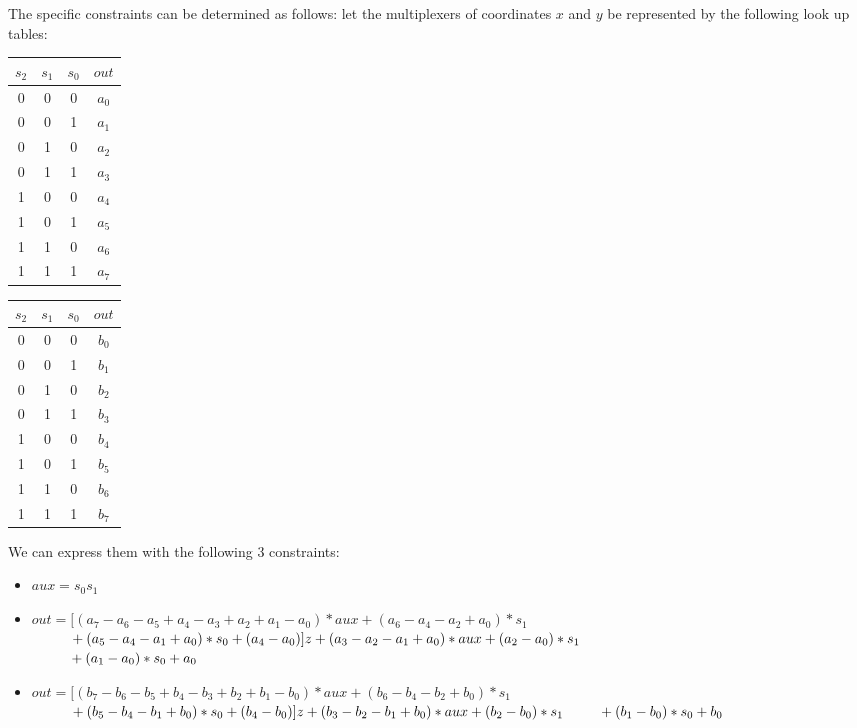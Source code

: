 The specific constraints can be determined as follows: let the multiplexers of coordinates $x$ and $y$ be represented by the following look up tables:
\newpage
\begin{table}[h]
    \begin{minipage}{.5\linewidth}
      \centering
	\begin{tabular}{c|c|c|c}
                $s_2$ & $s_1$ & $s_0$ & $out$\\
                	\hline
                	0 & 0 & 0 & $a_0$\\
                	0 & 0 & 1 & $a_1$\\
                	0 & 1 & 0 & $a_2$\\
                	0 & 1 & 1 & $a_3$\\
                	1 & 0 & 0 & $a_4$\\
                	1 & 0 & 1 & $a_5$\\
                	1 & 1 & 0 & $a_6$\\
                	1 & 1 & 1 & $a_7$
      	\end{tabular}
    \end{minipage}%
    \begin{minipage}{.5\linewidth}
      \centering
	\begin{tabular}{c|c|c|c}
		$s_2$ & $s_1$ & $s_0$ & $out$\\
		\hline
		0 & 0 & 0 & $b_0$\\
		0 & 0 & 1 & $b_1$\\
		0 & 1 & 0 & $b_2$\\
		0 & 1 & 1 & $b_3$\\
		1 & 0 & 0 & $b_4$\\
		1 & 0 & 1 & $b_5$\\
		1 & 1 & 0 & $b_6$\\
		1 & 1 & 1 & $b_7$
	\end{tabular}
    \end{minipage} 
\end{table}

\noi We can express them with the following 3 constraints:
\begin{itemize}
    \item 	$aux = s_0 s_1$ %
    \item 	$out = [ (a_7-a_6-a_5+a_4-a_3+a_2+a_1-a_0)*aux 
    		+ (a_6-a_4-a_2+a_0)*s_1$ \\
    		$\text{\qquad\;\;} + (a_5-a_4-a_1+a_0)*s_0
    		+ (a_4 - a_0) ] z 
    		+ (a_3-a_2-a_1+a_0)*aux + (a_2-a_0)*s_1 $\\
    		$\text{\qquad\;\;} + (a_1-a_0)*s_0+ a_0$
    \item	$ out = [ (b_7-b_6-b_5+b_4-b_3+b_2+b_1-b_0)*aux 
    		+ (b_6-b_4-b_2+b_0)*s_1$ \\
    		$\text{\qquad\;\;} + (b_5-b_4-b_1+b_0)*s_0 
    		+ (b_4 - b_0)] z 
    		+ (b_3-b_2-b_1+b_0)*aux + (b_2-b_0)*s_1 \\
    		\text{\qquad\;\:} + (b_1-b_0)*s_0+ b_0$\\
\end{itemize}
